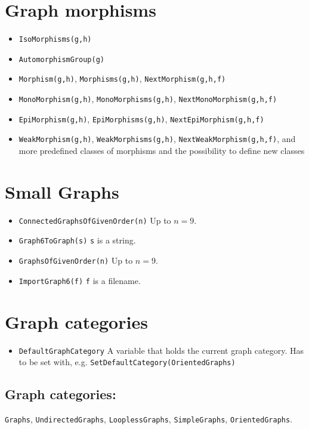 \documentclass[11pt]{article}
\begin{document}
\begin{multicols}{3}
\section{Graph morphisms}
\label{sec:org23e7bd4}

\begin{itemize}
\item \texttt{IsoMorphisms(g,h)}
\item \texttt{AutomorphismGroup(g)}
\item \texttt{Morphism(g,h)}, \texttt{Morphisms(g,h)}, \texttt{NextMorphism(g,h,f)}
\item \texttt{MonoMorphism(g,h)}, \texttt{MonoMorphisms(g,h)}, \texttt{NextMonoMorphism(g,h,f)}
\item \texttt{EpiMorphism(g,h)}, \texttt{EpiMorphisms(g,h)}, \texttt{NextEpiMorphism(g,h,f)}
\item \texttt{WeakMorphism(g,h)}, \texttt{WeakMorphisms(g,h)},
\texttt{NextWeakMorphism(g,h,f)}, and more predefined classes of morphisms and the
possibility to define new classes
\end{itemize}

\section{Small Graphs}
\label{sec:orgefb2c0d}

\begin{itemize}
\item \texttt{ConnectedGraphsOfGivenOrder(n)} Up to \(n=9\).
\item \texttt{Graph6ToGraph(s)} \texttt{s} is a string.
\item \texttt{GraphsOfGivenOrder(n)} Up to \(n=9\).
\item \texttt{ImportGraph6(f)} \texttt{f} is a filename.
\end{itemize}

\section{Graph categories}
\label{sec:org853429d}

\begin{itemize}
\item \texttt{DefaultGraphCategory} A variable that holds the current graph
category. Has to be set with, e.g. \texttt{SetDefaultCategory(OrientedGraphs)}
\end{itemize}

\subsection{Graph categories:}
\label{sec:orge59deb4}
\texttt{Graphs}, \texttt{UndirectedGraphs}, \texttt{LooplessGraphs}, \texttt{SimpleGraphs},
\texttt{OrientedGraphs}. 


\end{multicols}
\end{document}
